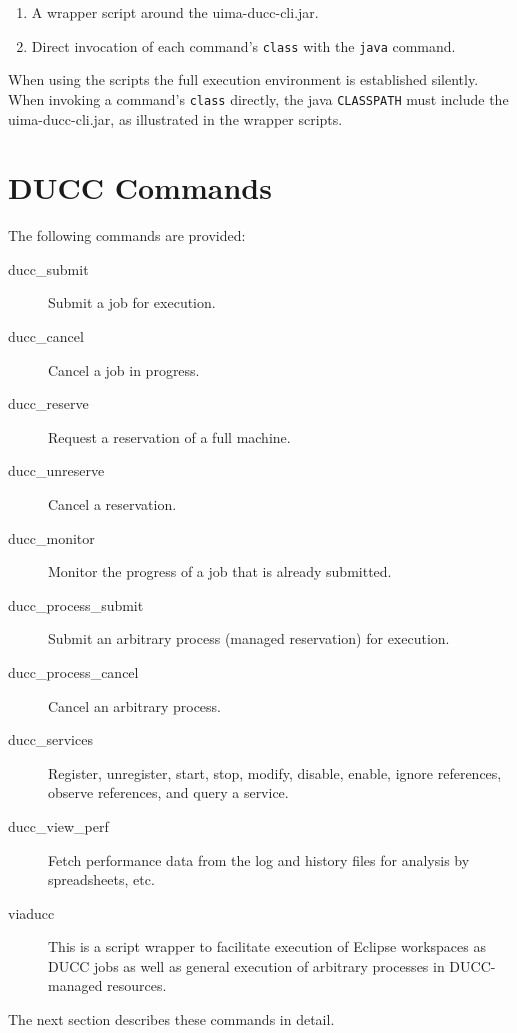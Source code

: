     \begin{enumerate}
      \item A wrapper script around the uima-ducc-cli.jar.
      \item Direct invocation of each command's {\tt class} with the {\tt java} command.
    \end{enumerate}

    When using the scripts the full execution environment is established
    silently.  When invoking a command's {\tt class} directly, the java {\tt CLASSPATH}
    must include the uima-ducc-cli.jar, as illustrated in the wrapper scripts.

    \section{DUCC Commands}
    The following commands are provided:
    \begin{description}
    \item[ducc\_submit] Submit a job for execution.
    \item[ducc\_cancel] Cancel a job in progress.
    \item[ducc\_reserve] Request a reservation of a full machine.
    \item[ducc\_unreserve] Cancel a reservation.
    \item[ducc\_monitor] Monitor the progress of a job that is already submitted.
    \item[ducc\_process\_submit] Submit an arbitrary process (managed reservation) for execution.
    \item[ducc\_process\_cancel] Cancel an arbitrary process.
    \item[ducc\_services] Register, unregister, start, stop, modify, disable, enable, 
      ignore references, observe references, and query a service.
    \item[ducc\_view\_perf] Fetch performance data from the log and history files for analysis
      by spreadsheets, etc.
    \item[viaducc] This is a script wrapper to facilitate execution of Eclipse workspaces as
      DUCC jobs as well as general execution of arbitrary processes in DUCC-managed resources.
    \end{description}
    
    The next section describes these commands in detail.

    
    
    
    
    
    
    
    
    


